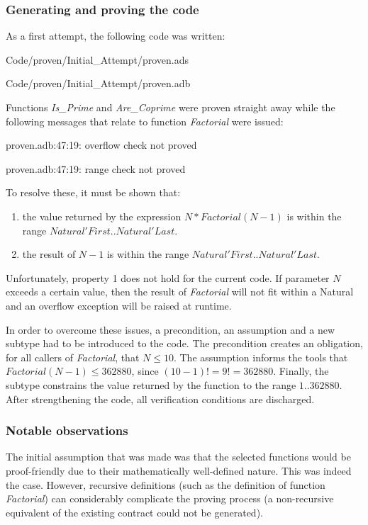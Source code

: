 \documentclass{llncs}
\begin{document}
\subsubsection{Generating and proving the code}
As a first attempt, the following code was written:

{Code/proven/Initial_Attempt/proven.ads}

{Code/proven/Initial_Attempt/proven.adb}

Functions \emph{Is\_Prime} and \emph{Are\_Coprime} were proven
straight away while the following messages that relate to function
\emph{Factorial} were issued:

proven.adb:47:19: overflow check not proved

proven.adb:47:19: range check not proved

\noindent
To resolve these, it must be shown that:
\begin{enumerate}
\item the value returned by the expression $N * Factorial (N - 1)$ is
  within the range $Natural'First .. Natural'Last$.

\item the result of $N - 1$ is within the range $Natural'First
  .. Natural'Last$.
\end{enumerate}
Unfortunately, property 1 does not hold for the current code. If
parameter $N$ exceeds a certain value, then the result of
\emph{Factorial} will not fit within a Natural and an overflow
exception will be raised at runtime.

In order to overcome these issues, a precondition, an assumption and a
new subtype had to be introduced to the code. The precondition creates
an obligation, for all callers of \emph{Factorial}, that $N \leq
10$. The assumption informs the tools that $Factorial (N - 1) \leq
362880$, since $(10 - 1)! = 9! = 362880$. Finally, the subtype
constrains the value returned by the function to the range $1
.. 362880$. After strengthening the code, all verification conditions
are discharged.




\subsubsection{Notable observations}
The initial assumption that was made was that the selected functions
would be proof-friendly due to their mathematically well-defined
nature. This was indeed the case. However, recursive definitions (such
as the definition of function \emph{Factorial}) can considerably
complicate the proving process (a non-recursive equivalent of the
existing contract could not be generated).
\end{document}

